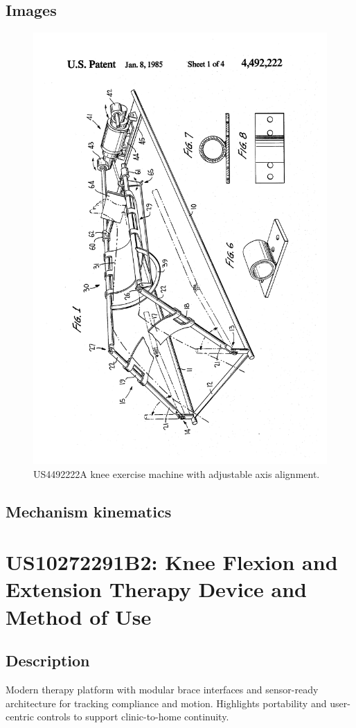 \documentclass[11pt]{article}
\begin{document}
\subsection{Images}
\begin{figure}[H]
  \centering
  \includegraphics[width=0.54\linewidth, angle=-90]{4492222A_1.png}
  \caption{US4492222A knee exercise machine with adjustable axis alignment.}
  \label{fig:US4492222A}
\end{figure}

\subsection{Mechanism kinematics}

\section{US10272291B2: Knee Flexion and Extension Therapy Device and Method of Use}
\subsection{Description}
Modern therapy platform with modular brace interfaces and sensor-ready architecture for tracking compliance and motion. Highlights portability and user-centric controls to support clinic-to-home continuity.
\end{document}
